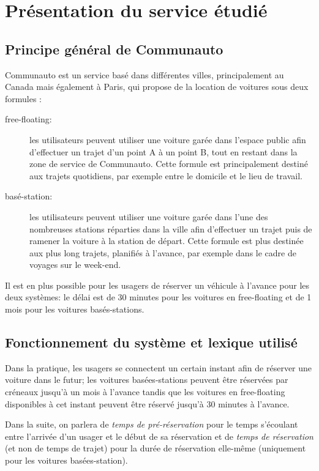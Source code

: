 \documentclass[12pt,a4paper]{article}
\author{Florian VERDIER}
\theoremstyle{definition}
\begin{document}
\section{Présentation du service étudié}
\subsection{Principe général de Communauto}
Communauto est un service basé dans différentes villes, principalement au Canada mais également à Paris, qui propose de la location de voitures sous deux formules :
\begin{description}
\item[free-floating:] les utilisateurs peuvent utiliser une voiture garée dans l'espace public afin d'effectuer un trajet d'un point A à un point B, tout en restant dans la zone de service de Communauto. Cette formule est principalement destiné aux trajets quotidiens, par exemple entre le domicile et le lieu de travail.
\item[basé-station:] les utilisateurs peuvent utiliser une voiture garée dans l'une des nombreuses stations réparties dans la ville afin d'effectuer un trajet puis de ramener la voiture à la station de départ. Cette formule est plus destinée aux plus long trajets, planifiés à l'avance, par exemple dans le cadre de voyages sur le week-end. 
\end{description}

Il est en plus possible pour les usagers de réserver un véhicule à l'avance pour les deux systèmes: le délai est de 30 minutes pour les voitures en free-floating et de 1 mois pour les voitures basés-stations.

\subsection{Fonctionnement du système et lexique utilisé}

Dans la pratique, les usagers se connectent un certain instant afin de réserver une voiture dans le futur;
les voitures basées-stations peuvent être réservées par créneaux jusqu'à un mois à l'avance tandis que les voitures en free-floating disponibles à cet instant peuvent être réservé jusqu'à 30 minutes à l'avance.

Dans la suite, on parlera de \emph{temps de pré-réservation} pour le temps s'écoulant entre l'arrivée d'un usager et le début de sa réservation et de \emph{temps de réservation} (et non de temps de trajet) pour la durée de réservation elle-même (uniquement pour les voitures basées-station).
\end{document}
